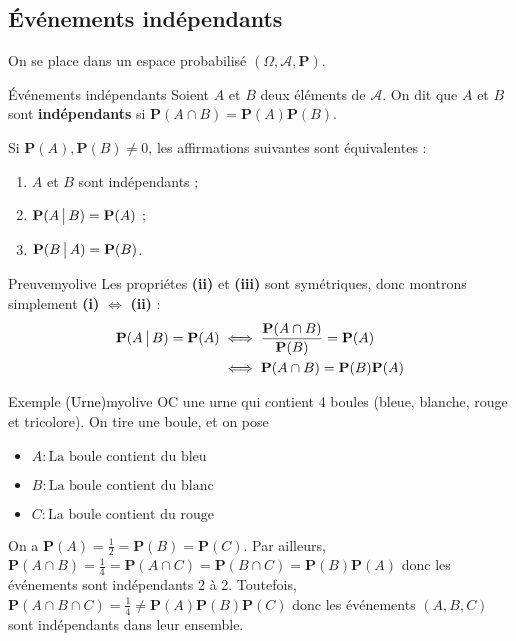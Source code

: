     \subsection{Événements indépendants}

    On se place dans un espace probabilisé $(\Omega, \mathcal{A}, \mathbf{P})$.

    \begin{defi}{Événements indépendants}{}
        Soient $A$ et $B$ deux éléments de $\mathcal{A}$. On dit que $A$ et $B$ sont \textbf{indépendants} si $\mathbf{P}(A \cap B) = \mathbf{P}(A) \mathbf{P}(B)$.
    \end{defi}

    \begin{prop}{}{}
        Si $\mathbf{P}(A), \mathbf{P}(B) \neq 0$, les affirmations suivantes sont équivalentes : 
        \begin{enumerate}
            \item $A$ et $B$ sont indépendants ;
            \item $\mathbf{P}(A \, \big| \, B) = \mathbf{P}(A)$ ;
            \item $\mathbf{P}(B \, \big| \, A) = \mathbf{P}(B)$.
        \end{enumerate}
    \end{prop}

    \begin{demo}{Preuve}{myolive}
        Les propriétes \textbf{(ii)} et \textbf{(iii)} sont symétriques, donc montrons simplement \textbf{(i)} $\iff$ \textbf{(ii)} :
        \begin{align*}
            \mathbf{P}(A \, \big| \, B) = \mathbf{P}(A) 
            &\iff \frac{\mathbf{P}(A \cap B)}{\mathbf{P}(B)} = \mathbf{P}(A) \\
            &\iff \mathbf{P}(A \cap B) = \mathbf{P}(B) \mathbf{P}(A)
        \end{align*}
    \end{demo}

    \begin{omed}{Exemple \textcolor{black}{(Urne)}}{myolive}
        OC une urne qui contient 4 boules (bleue, blanche, rouge et tricolore). On tire une boule, et on pose \begin{itemize}
            \item $A : \text{La boule contient du bleu}$
            \item $B : \text{La boule contient du blanc}$
            \item $C : \text{La boule contient du rouge}$
        \end{itemize}
        On a $\mathbf{P}(A) = \frac{1}{2} = \mathbf{P}(B) = \mathbf{P}(C)$. Par ailleurs, $\mathbf{P}(A \cap B) = \frac{1}{4} = \mathbf{P}(A \cap C) = \mathbf{P}(B \cap C) = \mathbf{P}(B)\mathbf{P}(A)$ donc les événements sont indépendants 2 à 2. Toutefois, $\mathbf{P}(A \cap B \cap C) = \frac{1}{4} \neq \mathbf{P}(A) \mathbf{P}(B) \mathbf{P}(C)$ donc les événements $(A,B,C)$ sont indépendants dans leur ensemble.
    \end{omed}

